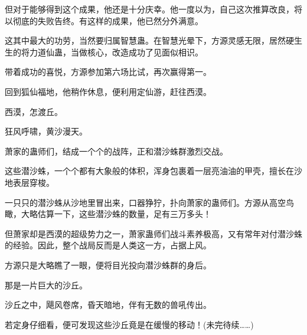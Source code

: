 \begin{this_body}
但对于能够得到这个成果，他还是十分庆幸。他一度以为，自己这次推算改良，将以彻底的失败告终。有这样的成果，他已然分外满意。

这其中最大的功劳，当然要归属智慧蛊。在智慧光晕下，方源灵感无限，居然硬生生的将力道仙蛊，当做核心，改造成功了见面似相识。

带着成功的喜悦，方源参加第六场比试，再次赢得第一。

回到狐仙福地，他稍作休息，便利用定仙游，赶往西漠。

西漠，怎渡丘。

狂风呼啸，黄沙漫天。

萧家的蛊师们，结成一个个的战阵，正和潜沙蛛群激烈交战。

这些潜沙蛛，一个个都有大象般的体积，浑身包裹着一层亮油油的甲壳，擅长在沙地表层穿梭。

一只只的潜沙蛛从沙地里冒出来，口器狰狞，扑向萧家的蛊师们。方源从高空鸟瞰，大略估算一下，这些潜沙蛛的数量，足有三万多头！

但萧家却是西漠的超级势力之一，萧家蛊师们战斗素养极高，又有常年对付潜沙蛛的经验。因此，整个战局反而是人类这一方，占据上风。

方源只是大略瞧了一眼，便将目光投向潜沙蛛群的身后。

那是一片巨大的沙丘。

沙丘之中，飓风卷席，昏天暗地，伴有无数的兽吼传出。

若定身仔细看，便可发现这些沙丘竟是在缓慢的移动！(未完待续……)

\end{this_body}

